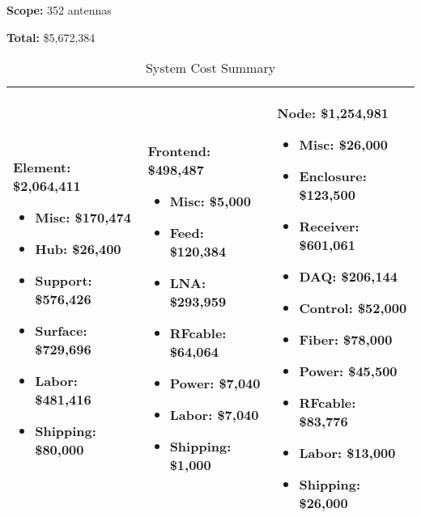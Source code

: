 \noindent
{\bf Scope:}  352 antennas
\vspace{0.3in}

\noindent
{\bf Total:}  \$5,672,384
\vspace{0.3in}

\begin{table}[t]
\centering
\caption{System Cost Summary}
\label{tab:budgetsummary}
\begin{tabular}{| p{2in} | p{2in} | p{2in} | }\\ \hline
\noindent
\textbf{Element:}  \$2,064,411
\begin{itemize}[parsep=-2pt, itemsep=-3pt]
\item Misc:   \$170,474
\item Hub:   \$26,400
\item Support:   \$576,426
\item Surface:   \$729,696
\item Labor:   \$481,416
\item Shipping:   \$80,000
\end{itemize}
 &
 \noindent
\textbf{Frontend:}  \$498,487
\begin{itemize}[parsep=-2pt, itemsep=-3pt]
\item Misc:   \$5,000
\item Feed:   \$120,384
\item LNA:   \$293,959
\item RFcable:   \$64,064
\item Power:   \$7,040
\item Labor:   \$7,040
\item Shipping:   \$1,000
\end{itemize}
 &
 \noindent
\textbf{Node:}  \$1,254,981
\begin{itemize}[parsep=-2pt, itemsep=-3pt]
\item Misc:   \$26,000
\item Enclosure:   \$123,500
\item Receiver:   \$601,061
\item DAQ:   \$206,144
\item Control:   \$52,000
\item Fiber:   \$78,000
\item Power:   \$45,500
\item RFcable:   \$83,776
\item Labor:   \$13,000
\item Shipping:   \$26,000
\end{itemize}
\\ \hline

\end{tabular}
\end{table}
